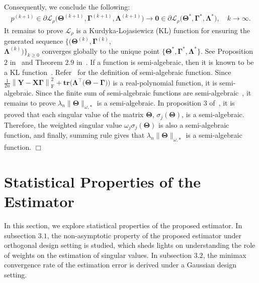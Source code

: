 \documentclass[alpha-refs]{wiley-article}
\begin{document}
Consequently, we conclude the following:
\begin{align*}
    p^{(k+1)}\in\partial \mathcal{L}_{\rho} \big( \boldsymbol{\Theta}^{(k+1)},\boldsymbol{\Gamma}^{(k+1)},\boldsymbol{\Lambda}^{(k+1)} \big) \rightarrow{ \boldsymbol{0}\in\partial \mathcal{L}_{\rho} \big( \boldsymbol{\Theta}^{*},\boldsymbol{\Gamma}^{*},\boldsymbol{\Lambda}^{*} \big)}, \quad
    k\rightarrow{\infty}.
\end{align*}
It remains to prove $\mathcal{L}_{\rho}$ is a Kurdyka-Lojasiewicz (KL) function for ensuring the generated sequence
$\{(\boldsymbol{\Theta}^{(k)},\boldsymbol{\Gamma}^{(k)}$,\\
$\boldsymbol{\Lambda}^{(k)})\}_{k \geq 0}$ converges globally to the unique point 
$\{\boldsymbol{\Theta}^{*},\boldsymbol{\Gamma}^{*},\boldsymbol{\Lambda}^{*}\}$.
See Proposition $2$ in~\citet{wang2019global} and Theorem $2.9$ in~\citet{attouch2013convergence}.
If a function is semi-algebraic, then it is known to be a KL function~\citep{attouch2013convergence,sun2017global}.
Refer~\citet{sun2017global} for the definition of semi-algebraic function.
Since $\frac{1}{2n}\left\| \boldsymbol{Y}-\boldsymbol{X\Gamma} \right\|_{\text{F}}^{2}+\textbf{tr}\big( \boldsymbol{\Lambda}^{\top}\big( \boldsymbol{\Theta}-\boldsymbol{\Gamma} \big)\big)$ is a real-polynomial function, it is semi-algebraic.
Since the finite sum of semi-algebraic functions are semi-algebraic~\citep{attouch2013convergence}, it remains to prove $\lambda_{n}\|\boldsymbol{\Theta}\|_{\omega,*}$ is a semi-algebraic. 
In proposition $3$ of~\citet{sun2017global}, it is proved that each singular value of the matrix $\boldsymbol{\Theta}$, $\sigma_{j}(\boldsymbol{\Theta})$, is a semi-algebraic.
Therefore, the weighted singular value $\omega_{j}\sigma_{j}(\boldsymbol{\Theta})$ is also a semi-algebraic function, and finally, summing rule gives that $\lambda_{n}\|\boldsymbol{\Theta}\|_{\omega,*}$ is a semi-algebraic function. 
\qquad \qquad $\Box$

\section{Statistical Properties of the Estimator}
In this section, we explore statistical properties of the proposed estimator.
In subsection $3.1$, the non-asymptotic property of the proposed estimator under orthogonal design setting is studied, which sheds lights on understanding the role of weights on the estimation of singular values. 
In subsection $3.2$, the minimax convergence rate of the estimation error is derived under a Gaussian design setting.
\end{document}
